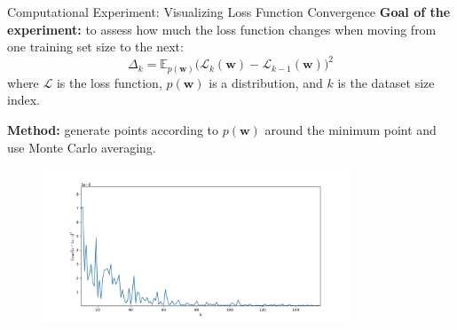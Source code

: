 \documentclass[10pt]{beamer}
\begin{document}
\begin{frame}{Computational Experiment: Visualizing Loss Function Convergence}
    \textbf{Goal of the experiment:} to assess how much the loss function changes when moving 
    from one training set size to the next:
    $$
    \Delta_k = \mathbb{E}_{p(\mathbf{w})} \bigl( \mathcal{L}_{k}(\mathbf{w}) - \mathcal{L}_{k-1}(\mathbf{w}) \bigr)^2
    $$
    where $\mathcal{L}$ is the loss function, $p(\mathbf{w})$ is a distribution, and $k$ is the dataset size index.

    \textbf{Method:} generate points according to $p(\mathbf{w})$ around the minimum point and 
    use Monte Carlo averaging.

    \begin{figure}[!htbp]
        \vspace*{-0.17cm}
        \centering
        \includegraphics[width=0.82\textwidth]{img/Dm_32.pdf}
    \end{figure}
\end{frame}
\end{document}
